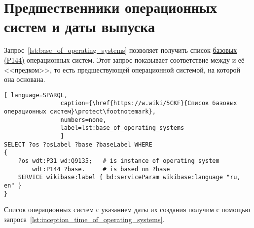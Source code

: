 \section{Предшественники операционных систем и даты выпуска}

Запрос~\ref{lst:base_of_operating_systems} позволяет получить 
список \href{https://www.wikidata.org/wiki/Property_talk:P144}{базовых (P144)} операционных систем. 
Этот запрос показывает соответствие 
между  и её <<предком>>, 
то есть предшествующей операционной системой, на которой она основана.


\begin{lstlisting}[ language=SPARQL, 
                caption={\href{https://w.wiki/5CKF}{Список базовых операционных систем}\protect\footnotemark},
                numbers=none,
                label=lst:base_of_operating_systems
                ]
SELECT ?os ?osLabel ?base ?baseLabel WHERE
{
    ?os wdt:P31 wd:Q9135;   # is instance of operating system
        wdt:P144 ?base.     # is based on ?base
    SERVICE wikibase:label { bd:serviceParam wikibase:language "ru, en" }
}
\end{lstlisting}





Список операционных систем с указанием даты их создания 
получим с помощью запроса~\ref{lst:inception_time_of_operating_systems}.
%

